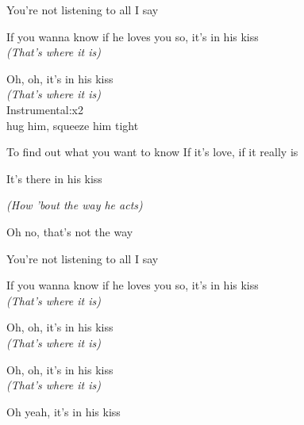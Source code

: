 You're not listening to all I say

If you wanna know if he loves you so, it's in his kiss\\


\emph{(That's where it is)}

Oh, oh, it's in his kiss\\


\emph{(That's where it is)}\\


Instrumental:\hrulefill{}\hrulefill{}\hrulefill{}\hrulefill{}\hrulefill x2\\


hug him, squeeze him tight

To find out what you want to know If it's love, if it really is

It's there in his kiss

\emph{(How 'bout the way he acts)}

Oh no, that's not the way

You're not listening to all I say

If you wanna know if he loves you so, it's in his kiss\\
 

\emph{(That's where it is)}

Oh, oh, it's in his kiss\\


\emph{(That's where it is)}

Oh, oh, it's in his kiss\\


\emph{(That's where it is)}

Oh yeah, it's in his kiss\hrulefill{}\hrulefill{}